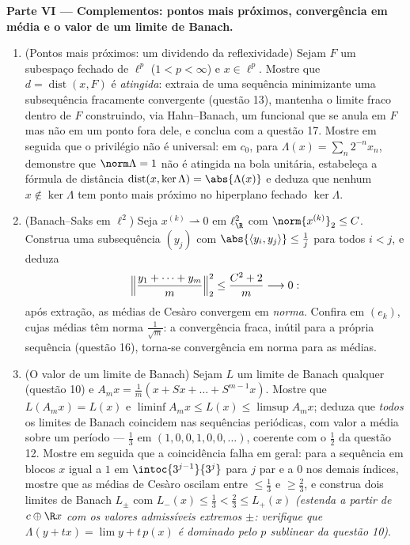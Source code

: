 \begin{problem}[{Problema de fim de semana --- $(\ell^p)' = \ell^q$, reflexividade e a
estranheza de $\ell^\infty$}]
\medskip
\noindent\textbf{Parte VI --- Complementos: pontos mais próximos,
convergência em média e o valor de um limite de Banach.}
\begin{enumerate}[resume]
  \item (Pontos mais próximos: um dividendo da reflexividade) Sejam
        $F$ um subespaço fechado de $\ell^p$ ($1 < p < \infty$) e $x \in \ell^p$.
        Mostre que $d = \operatorname{dist}(x,
        F)$ é \emph{atingida}: extraia de uma sequência
        minimizante uma subsequência fracamente convergente (questão
        13), mantenha o limite fraco dentro de $F$ construindo, via
        Hahn--Banach, um funcional que se anula em $F$ mas não em um
        ponto fora dele, e conclua com a questão 17. Mostre em seguida
        que o privilégio não é universal: em $c_0$, para $\Lambda(x) = \sum_n2^{-n}x_n$,
        demonstre que $\norm\Lambda = 1$ não é atingida na bola unitária, estabeleça
        a fórmula de distância $\operatorname{dist}(x, \ker\Lambda) =
        \abs{\Lambda(x)}$ e deduza que nenhum $x \notin
        \ker\Lambda$ tem ponto
        mais próximo no hiperplano fechado $\ker\Lambda$.
  \item (Banach--Saks em $\ell^2$) Seja $x^{(k)}
        \rightharpoonup 0$ em $\ell^2_{\R}$ com $\norm{x^{(k)}}_2 \leq C$.
        Construa uma subsequência $(y_j)$ com $\abs{\langle y_i, y_j\rangle} \leq
        \frac1j$ para todos
        $i < j$, e deduza
        \[
        \Bigl\lVert\frac{y_1 + \dots + y_m}m\Bigr\rVert_2^2
        \leq \frac{C^2 + 2}m \longrightarrow 0 :
        \]
        após extração, as médias de Cesàro convergem em \emph{norma}.
        Confira em $(e_k)$, cujas médias têm norma $\frac1{\sqrt m}$: a
        convergência fraca, inútil para a própria sequência (questão
        16), torna-se convergência em norma para as médias.
  \item (O valor de um limite de Banach) Sejam $L$ um limite de
        Banach qualquer (questão 10) e $A_mx = \frac1m(x + Sx + \dots
        + S^{m-1}x)$. Mostre que $L(A_mx) = L(x)$ e $\liminf A_mx
        \leq L(x) \leq \limsup A_mx$;
        deduza que \emph{todos} os limites de Banach coincidem nas
        sequências periódicas, com valor a média sobre um período ---
        $\frac13$ em $(1, 0, 0, 1,
        0, 0, \dots)$, coerente com o $\frac12$ da questão 12. Mostre em
        seguida que a coincidência falha em geral: para a sequência em
        blocos $x$ igual a $1$ em $\intoc{3^{j-1}}{3^j}$ para $j$ par e a
        $0$ nos demais índices, mostre que as médias de Cesàro
        oscilam entre $\leq
        \frac13$ e $\geq \frac23$, e construa dois limites de Banach
        $L_\pm$ com $L_-(x) \leq \frac13 < \frac23
        \leq L_+(x)$ \emph{(estenda a partir de $c \oplus \R x$ com os
        valores admissíveis extremos $\pm$: verifique que $\Lambda(y + tx) = \lim y + t\,p(x)$ é
        dominado pelo $p$ sublinear da questão 10)}.
\end{enumerate}
\end{problem}
